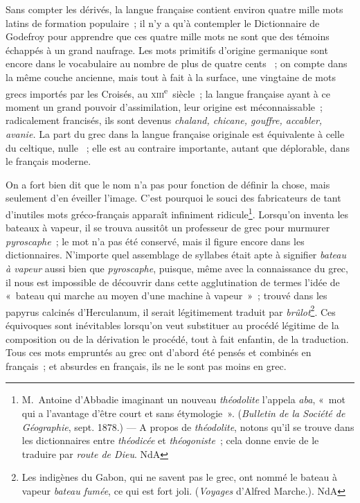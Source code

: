 \documentclass[french,twoside]{book} %
\newcommand\chaptercont{} %
\begin{document}
\chaptercont
\noindent Sans compter les dérivés, la langue française contient environ quatre mille mots latins de formation populaire ; il n’y a qu’à contempler le Dictionnaire de Godefroy pour apprendre que ces quatre mille mots ne sont que des témoins échappés à un grand naufrage. Les mots primitifs d’origine germanique sont encore dans le vocabulaire au nombre de plus de quatre cents  ; on compte dans la même couche ancienne, mais tout à fait à la surface, une vingtaine de mots grecs importés par les Croisés, au \textsc{xiii}\textsuperscript{e} siècle ; la langue française ayant à ce moment un grand pouvoir d’assimilation, leur origine est méconnaissable ; radicalement francisés, ils sont devenus {\itshape chaland, chicane, gouffre, accabler, avanie.} La part du grec dans la langue française originale est équivalente à celle du celtique, nulle  ; elle est au contraire importante, autant que déplorable, dans le français moderne.\par
On a fort bien dit que le nom n’a pas pour fonction de définir la chose, mais seulement d’en éveiller l’image. C’est pourquoi le souci des fabricateurs de tant d’inutiles mots gréco-français apparaît infiniment ridicule\footnote{M. Antoine d’Abbadie imaginant un nouveau {\itshape théodolite} l’appela {\itshape aba}, « mot qui a l’avantage d’être court et sans étymologie ». ({\itshape Bulletin de la Société de Géographie}, sept. 1878.) — A propos de {\itshape théodolite}, notons qu’il se trouve dans les dictionnaires entre {\itshape théodicée} et {\itshape théogoniste} ; cela donne envie de le traduire par {\itshape route de Dieu}. NdA}. Lorsqu’on inventa les bateaux à vapeur, il se trouva aussitôt un professeur de grec pour murmurer {\itshape pyroscaphe} ; le mot n’a pas été conservé, mais il figure encore dans les dictionnaires. N’importe quel assemblage de syllabes était apte à signifier {\itshape bateau à vapeur} aussi bien que {\itshape pyroscaphe}, puisque, même avec la connaissance du grec, il nous est impossible de découvrir dans cette agglutination de termes l’idée de « bateau qui marche au moyen d’une machine à vapeur » ; trouvé dans les papyrus calcinés d’Herculanum, il serait légitimement traduit par {\itshape brûlot}\footnote{Les indigènes du Gabon, qui ne savent pas le grec, ont nommé le bateau à vapeur {\itshape bateau fumée}, ce qui est fort joli. ({\itshape Voyages} d’Alfred Marche.). NdA}. Ces équivoques sont inévitables lorsqu’on veut substituer au procédé légitime de la composition ou de la dérivation le procédé, tout à fait enfantin, de la traduction. Tous ces mots empruntés au grec ont d’abord été pensés et combinés en français ; et absurdes en français, ils ne le sont pas moins en grec.\par
\end{document}
